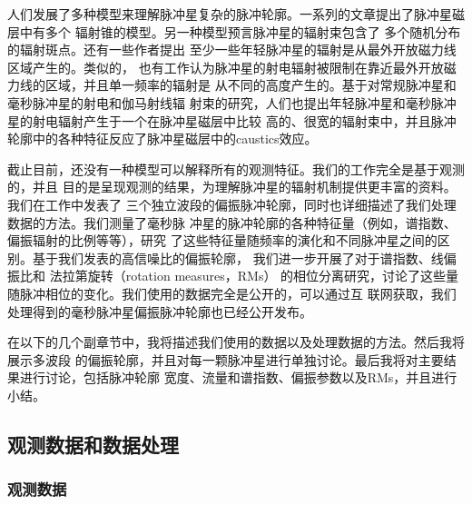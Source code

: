 人们发展了多种模型来理解脉冲星复杂的脉冲轮廓。一系列的文章提出了脉冲星磁层中有多个
辐射锥的模型\supercite{Rankin83,Kramer94b,Gupta03}。另一种模型预言脉冲星的辐射束包含了
多个随机分布的辐射斑点\supercite{Lyne88,Manchester95b,Han01}。还有一些作者提出
至少一些年轻脉冲星的辐射是从最外开放磁力线区域产生的\supercite{Johnston06}。类似的，
也有工作认为脉冲星的射电辐射被限制在靠近最外开放磁力线的区域，并且单一频率的辐射是
从不同的高度产生的\supercite{Kara07}。基于对常规脉冲星和毫秒脉冲星的射电和伽马射线辐
射束的研究，人们也提出年轻脉冲星和毫秒脉冲星的射电辐射产生于一个在脉冲星磁层中比较
高的、很宽的辐射束中，并且脉冲轮廓中的各种特征反应了脉冲星磁层中的caustics效应\supercite{Manchester05b,Ravi10}。

截止目前，还没有一种模型可以解释所有的观测特征。我们的工作完全是基于观测的，并且
目的是呈现观测的结果，为理解脉冲星的辐射机制提供更丰富的资料。我们在工作中发表了
三个独立波段的偏振脉冲轮廓，同时也详细描述了我们处理数据的方法。我们测量了毫秒脉
冲星的脉冲轮廓的各种特征量（例如，谱指数、偏振辐射的比例等等），研究
了这些特征量随频率的演化和不同脉冲星之间的区别。基于我们发表的高信噪比的偏振轮廓，
我们进一步开展了对于谱指数\supercite{Lyne88,Kramer94a,Manchester04,Chen07}、线偏振比和
法拉第旋转（rotation measures，RMs）\supercite{Ramach04,Han06,Noutsos09}
的相位分离研究，讨论了这些量随脉冲相位的变化。我们使用的数据完全是公开的，可以通过互
联网获取，我们处理得到的毫秒脉冲星偏振脉冲轮廓也已经公开发布。

在以下的几个副章节中，我将描述我们使用的数据以及处理数据的方法。然后我将展示多波段
的偏振轮廓，并且对每一颗脉冲星进行单独讨论。最后我将对主要结果进行讨论，包括脉冲轮廓
宽度、流量和谱指数、偏振参数以及RMs，并且进行小结。

\subsection{观测数据和数据处理}

\subsubsection{观测数据}

